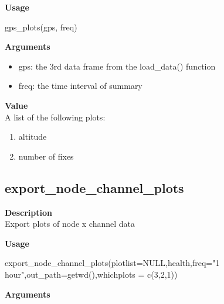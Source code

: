 \documentclass[
]{book}
\newenvironment{Shaded}{\begin{snugshade}}{\end{snugshade}}
\newcommand{\AttributeTok}[1]{\textcolor[rgb]{0.77,0.63,0.00}{#1}}
\newcommand{\ConstantTok}[1]{\textcolor[rgb]{0.00,0.00,0.00}{#1}}
\newcommand{\DecValTok}[1]{\textcolor[rgb]{0.00,0.00,0.81}{#1}}
\newcommand{\FunctionTok}[1]{\textcolor[rgb]{0.00,0.00,0.00}{#1}}
\newcommand{\NormalTok}[1]{#1}
\newcommand{\StringTok}[1]{\textcolor[rgb]{0.31,0.60,0.02}{#1}}
\providecommand{\tightlist}{%
  \setlength{\itemsep}{0pt}\setlength{\parskip}{0pt}}
\begin{document}
\textbf{Usage}

\begin{Shaded}
\begin{Highlighting}[]
\FunctionTok{gps\_plots}\NormalTok{(gps, freq)  }
\end{Highlighting}
\end{Shaded}

\textbf{Arguments}

\begin{itemize}
\tightlist
\item
  gps: the 3rd data frame from the load\_data() function\\
\item
  freq: the time interval of summary
\end{itemize}

\textbf{Value}\\
A list of the following plots:

\begin{enumerate}
\def\labelenumi{\arabic{enumi}.}
\tightlist
\item
  altitude\\
\item
  number of fixes
\end{enumerate}

\hypertarget{export_node_channel_plots}{%
\subsection{export\_node\_channel\_plots}\label{export_node_channel_plots}}

\textbf{Description}\\
Export plots of node x channel data

\textbf{Usage}

\begin{Shaded}
\begin{Highlighting}[]
\FunctionTok{export\_node\_channel\_plots}\NormalTok{(}\AttributeTok{plotlist=}\ConstantTok{NULL}\NormalTok{,health,}\AttributeTok{freq=}\StringTok{"1 hour"}\NormalTok{,}\AttributeTok{out\_path=}\FunctionTok{getwd}\NormalTok{(),}\AttributeTok{whichplots =} \FunctionTok{c}\NormalTok{(}\DecValTok{3}\NormalTok{,}\DecValTok{2}\NormalTok{,}\DecValTok{1}\NormalTok{))}
\end{Highlighting}
\end{Shaded}

\textbf{Arguments}
\end{document}
